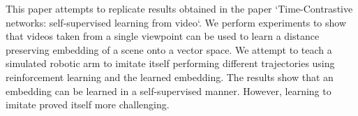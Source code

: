 This paper attempts to replicate results obtained in the paper `Time-Contrastive networks: self-supervised learning from video`. \citep{self-supervised-learning} We perform experiments to show that videos taken from a single viewpoint can be used to learn a distance preserving embedding of a scene onto a vector space. We attempt to teach a simulated robotic arm to imitate itself performing different trajectories using reinforcement learning and the learned embedding. The results show that an embedding can be learned in a self-supervised manner. However, learning to imitate proved itself more challenging.

